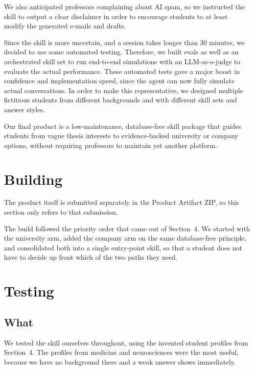 \documentclass[11pt,a4paper]{article}
\begin{document}
\noindent We also anticipated professors complaining about AI spam, so we instructed the skill to output a clear disclaimer in order to encourage students to at least modify the generated e-mails and drafts.


\noindent Since the skill is more uncertain, and a session takes longer than 30 minutes, we decided to use some automated testing. Therefore, we built evals as well as an orchestrated skill set to run end-to-end simulations with an LLM-as-a-judge to evaluate the actual performance. These automated tests gave a major boost in confidence and implementation speed,
since the agent can now fully simulate actual conversations.
In order to make this representative, we designed multiple fictitious students
from different backgrounds and with different skill sets and answer styles. 


\noindent Our final product is a low-maintenance, database-free skill package that guides students from vague thesis interests to evidence-backed university or company options, without requiring professors to maintain yet another platform.
\section{Building}

\noindent The product itself is submitted separately in the Product Artifact ZIP, so this section only refers to that submission.

\noindent The build followed the priority order that came out of Section~4. We started with the university arm, added the company arm on the same database-free principle, and consolidated both into a single entry-point skill, so that a student does not have to decide up front which of the two paths they need.

\section{Testing}

\subsection*{What}

\noindent We tested the skill ourselves throughout, using the invented student
profiles from Section~4. The profiles from medicine and neurosciences were the
most useful, because we have no background there and a weak answer shows
immediately.
\end{document}
